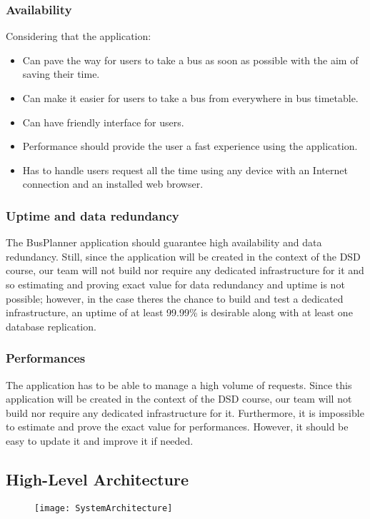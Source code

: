 \subsubsection{Availability}
Considering that the application:
\begin{itemize}
	\item Can pave the way for users to take a bus as soon as possible with the aim of saving their time.
	\item Can make it easier for users to take a bus from everywhere in bus timetable.
	\item Can have friendly interface for users.
	\item Performance should provide the user a fast experience using the application.
	\item Has to handle user\textquotesingle s request all the time using any device with an Internet connection and an installed web browser.
\end{itemize}

\subsubsection{Uptime and data redundancy}
The BusPlanner application should guarantee high availability and data redundancy. Still, since the application will be created in the context of the DSD course, our team will not build nor require any dedicated infrastructure for it and so estimating and proving exact value for data redundancy and uptime is not possible; however, in the case there\textquotesingle s the chance to build and test a dedicated infrastructure, an uptime of at least 99.99\% is desirable along with at least one database replication.

\subsubsection{Performances}
The application has to be able to manage a high volume of requests. Since this application will be created in the context of the DSD course, our team will not build nor require any dedicated infrastructure for it. Furthermore, it is impossible to estimate and prove the exact value for performances. However, it should be easy to update it and improve it if needed. 

\subsection{High-Level Architecture}
\begin{figure}[H]
	\centering
	\texttt{[image: SystemArchitecture]}
\end{figure}

